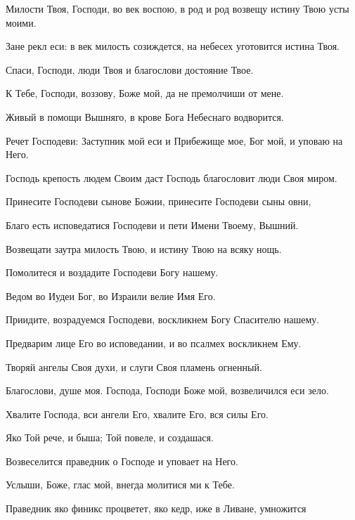 \begin{mymulticols}
 Милости Твоя, Господи, во век воспою, в род и род возвещу истину Твою усты моими.

 Зане рекл еси: в век милость созиждется, на небесех уготовится истина Твоя.

 Спаси, Господи, люди Твоя и благослови достояние Твое.

 К Тебе, Господи, воззову, Боже мой, да не премолчиши от мене.

 Живый в помощи Вышняго, в крове Бога Небеснаго водворится.

 Речет Господеви: Заступник мой еси и Прибежище мое, Бог мой, и уповаю на Него.

 Господь крепость людем Своим даст Господь благословит люди Своя миром.

 Принесите Господеви сынове Божии, принесите Господеви сыны овни,

 Благо есть исповедатися Господеви и пети Имени Твоему, Вышний.

 Возвещати заутра милость Твою, и истину Твою на всяку нощь.

 Помолитеся и воздадите Господеви Богу нашему.

 Ведом во Иудеи Бог, во Израили велие Имя Его.

 Приидите, возрадуемся Господеви, воскликнем Богу Спасителю нашему.

 Предварим лице Его во исповедании, и во псалмех воскликнем Ему.


 Творяй ангелы Своя духи, и слуги Своя пламень огненный.

 Благослови, душе моя. Господа, Господи Боже мой, возвеличился еси зело.

 Хвалите Господа, вси ангели Его, хвалите Его, вся силы Его.

 Яко Той рече, и быша; Той повеле, и создашася.

 Возвеселится праведник о Господе и уповает на Него.

 Услыши, Боже, глас мой, внегда молитися ми к Тебе.

 Праведник яко финикс процветет, яко кедр, иже в Ливане, умножится


\end{mymulticols}
